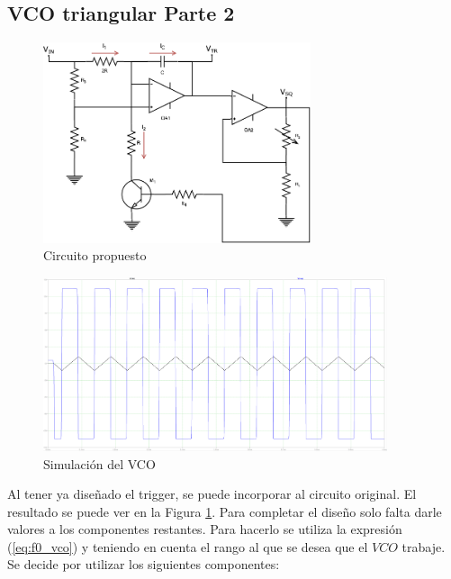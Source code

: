 \subsection{VCO triangular Parte 2}

\begin{figure}[h!]                                                       
    \centering\includegraphics[width=0.7\textwidth]{../Ex3/Resources/circuito_propuesto_2.png}
    \caption{Circuito propuesto}
    \label{fig:VCO_circuito_propuesto_2}
    \end{figure}

\begin{figure}[h!]                                                       
    \centering\includegraphics[width=0.9\textwidth]{../Ex3/Resources/sim_vco.png}
    \caption{Simulación del VCO}
    \label{fig:sim_VCO}
    \end{figure}

Al tener ya diseñado el trigger, se puede incorporar al circuito original. El resultado se puede ver en la Figura \ref{fig:VCO_circuito_propuesto_2}. Para completar el diseño solo falta darle valores a los componentes restantes. Para hacerlo se utiliza la expresión (\ref{eq:f0_vco}) y teniendo en cuenta el rango al que se desea que el $VCO$ trabaje. Se decide por utilizar los siguientes componentes:

